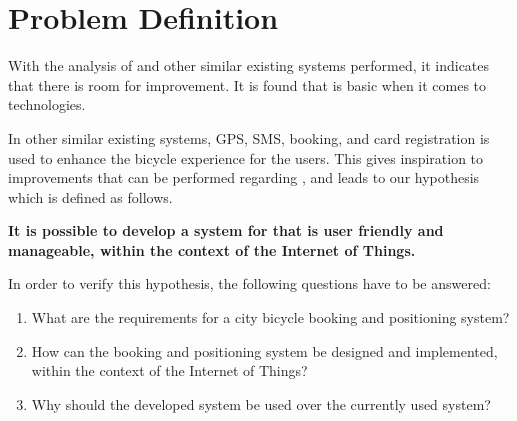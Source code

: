 \section{Problem Definition}\label{sec:probdef}
With the analysis of \bycykel and other similar existing systems performed, it indicates that there is room for improvement.
It is found that \bycykel is basic when it comes to technologies.

In other similar existing systems, GPS, SMS, booking, and card registration is used to enhance the bicycle experience for the users.
This gives inspiration to improvements that can be performed regarding \bycykelwithoutspace, and leads to our hypothesis which is defined as follows.

\begin{center}
\textbf{It is possible to develop a system for \bycykel that is user friendly and manageable, within the context of the Internet of Things.}
\end{center}

In order to verify this hypothesis, the following questions have to be answered:

\begin{enumerate}
	\item What are the requirements for a city bicycle booking and positioning system?
	\item How can the booking and positioning system be designed and implemented, within the context of the Internet of Things?
	\item Why should the developed system be used over the currently used system?
\end{enumerate}